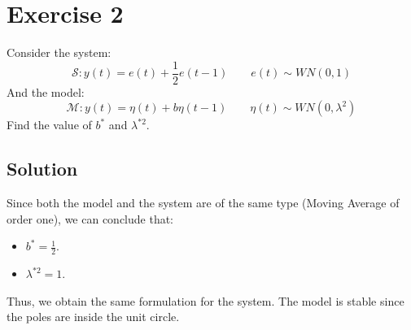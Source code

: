 \section{Exercise 2}

Consider the system: 
\[\mathcal{S}:y(t)=e(t)+\dfrac{1}{2}e(t-1)\qquad e(t)\sim WN(0,1)\]
And the model: 
\[\mathcal{M}:y(t)=\eta(t)+b\eta(t-1)\qquad \eta(t)\sim WN(0,\lambda^2)\]
Find the value of $b^\ast$ and $\lambda^{\ast 2}$. 

\subsection*{Solution}
Since both the model and the system are of the same type (Moving Average of order one), we can conclude that:
\begin{itemize}
    \item $b^\ast=\frac{1}{2}$. 
    \item $\lambda^{\ast 2}=1$. 
\end{itemize}
Thus, we obtain the same formulation for the system.
The model is stable since the poles are inside the unit circle. 